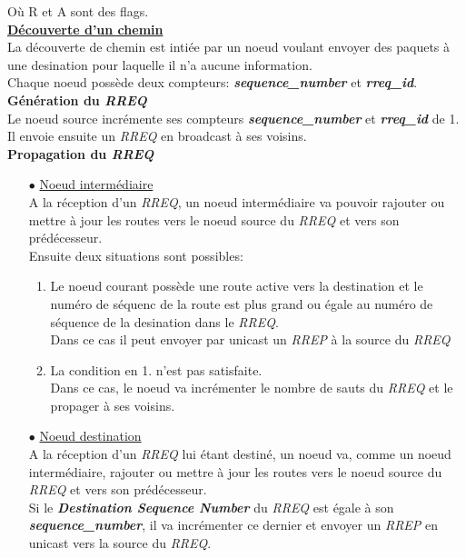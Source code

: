 \documentclass[a4paper, 12pt]{report}
\begin{document}
        Où R et A sont des flags.\\

        \underline{\textbf{Découverte d'un chemin}}\\
        La découverte de chemin est intiée par un noeud voulant envoyer des paquets à une desination pour laquelle il n'a aucune information.\\
        Chaque noeud possède deux compteurs: \textbf{\textit{sequence\_number}} et \textbf{\textit{rreq\_id}}.\\
        
        \textbf{Génération du \textit{RREQ}}\\
            Le noeud source incrémente ses compteurs \textbf{\textit{sequence\_number}} et \textbf{\textit{rreq\_id}} de 1.
            Il envoie ensuite un \textit{RREQ} en broadcast à ses voisins.\\
        
            \textbf{Propagation du \textit{RREQ}}\\
        \begin{itemize}
            \item[$\bullet$] \underline{Noeud intermédiaire}\\
                A la réception d'un \textit{RREQ}, un noeud intermédiaire va pouvoir rajouter ou mettre à jour
                les routes vers le noeud source du \textit{RREQ} et vers son prédécesseur.\\
                Ensuite deux situations sont possibles:
                \begin{enumerate}
                    \item Le noeud courant possède une route active vers la destination et le numéro de séquenc de la route est plus grand ou égale au numéro de séquence
                        de la desination dans le \textit{RREQ}.\\
                        Dans ce cas il peut envoyer par unicast un \textit{RREP} à la source du \textit{RREQ}
                    \item La condition en 1. n'est pas satisfaite.\\
                        Dans ce cas, le noeud va incrémenter le nombre de sauts du \textit{RREQ} et le propager à ses voisins.\\
                \end{enumerate}
                

            \item[$\bullet$] \underline{Noeud destination}\\
                A la réception d'un \textit{RREQ} lui étant destiné, un noeud va, comme un noeud intermédiaire, 
                rajouter ou mettre à jour les routes vers le noeud source du \textit{RREQ} et vers son prédécesseur.\\
                Si le \textbf{\textit{Destination Sequence Number}} du \textit{RREQ} est égale à son \textbf{\textit{sequence\_number}},
                il va incrémenter ce dernier et envoyer un \textit{RREP} en unicast vers la source du \textit{RREQ}.\\
             
        \end{itemize}
\end{document}
